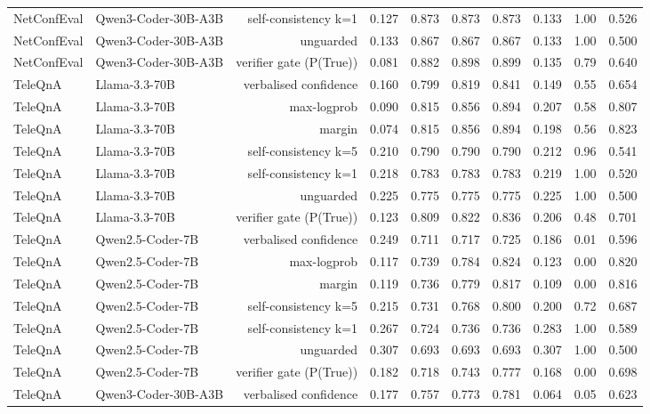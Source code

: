 \begin{tabular}{llrrrrrrrr}
NetConfEval & Qwen3-Coder-30B-A3B & self-consistency k=1 & 0.127 & 0.873 & 0.873 & 0.873 & 0.133 & 1.00 & 0.526 \\
NetConfEval & Qwen3-Coder-30B-A3B & unguarded & 0.133 & 0.867 & 0.867 & 0.867 & 0.133 & 1.00 & 0.500 \\
NetConfEval & Qwen3-Coder-30B-A3B & verifier gate (P(True)) & 0.081 & 0.882 & 0.898 & 0.899 & 0.135 & 0.79 & 0.640 \\
TeleQnA & Llama-3.3-70B & verbalised confidence & 0.160 & 0.799 & 0.819 & 0.841 & 0.149 & 0.55 & 0.654 \\
TeleQnA & Llama-3.3-70B & max-logprob & 0.090 & 0.815 & 0.856 & 0.894 & 0.207 & 0.58 & 0.807 \\
TeleQnA & Llama-3.3-70B & margin & 0.074 & 0.815 & 0.856 & 0.894 & 0.198 & 0.56 & 0.823 \\
TeleQnA & Llama-3.3-70B & self-consistency k=5 & 0.210 & 0.790 & 0.790 & 0.790 & 0.212 & 0.96 & 0.541 \\
TeleQnA & Llama-3.3-70B & self-consistency k=1 & 0.218 & 0.783 & 0.783 & 0.783 & 0.219 & 1.00 & 0.520 \\
TeleQnA & Llama-3.3-70B & unguarded & 0.225 & 0.775 & 0.775 & 0.775 & 0.225 & 1.00 & 0.500 \\
TeleQnA & Llama-3.3-70B & verifier gate (P(True)) & 0.123 & 0.809 & 0.822 & 0.836 & 0.206 & 0.48 & 0.701 \\
TeleQnA & Qwen2.5-Coder-7B & verbalised confidence & 0.249 & 0.711 & 0.717 & 0.725 & 0.186 & 0.01 & 0.596 \\
TeleQnA & Qwen2.5-Coder-7B & max-logprob & 0.117 & 0.739 & 0.784 & 0.824 & 0.123 & 0.00 & 0.820 \\
TeleQnA & Qwen2.5-Coder-7B & margin & 0.119 & 0.736 & 0.779 & 0.817 & 0.109 & 0.00 & 0.816 \\
TeleQnA & Qwen2.5-Coder-7B & self-consistency k=5 & 0.215 & 0.731 & 0.768 & 0.800 & 0.200 & 0.72 & 0.687 \\
TeleQnA & Qwen2.5-Coder-7B & self-consistency k=1 & 0.267 & 0.724 & 0.736 & 0.736 & 0.283 & 1.00 & 0.589 \\
TeleQnA & Qwen2.5-Coder-7B & unguarded & 0.307 & 0.693 & 0.693 & 0.693 & 0.307 & 1.00 & 0.500 \\
TeleQnA & Qwen2.5-Coder-7B & verifier gate (P(True)) & 0.182 & 0.718 & 0.743 & 0.777 & 0.168 & 0.00 & 0.698 \\
TeleQnA & Qwen3-Coder-30B-A3B & verbalised confidence & 0.177 & 0.757 & 0.773 & 0.781 & 0.064 & 0.05 & 0.623 \\

\end{tabular}

